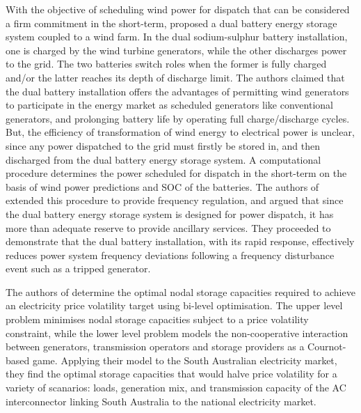 \documentclass[a4paper, 10pt, twocolumn, preprint, 3p]{elsarticle}
\begin{document}
With the objective of scheduling wind power for dispatch that can be considered a firm commitment in the short-term, \cite{YCTL10,YCTL12} proposed a dual battery energy storage system coupled to a wind farm.  In the dual sodium-sulphur battery installation, one is charged by the wind turbine generators, while the other discharges power to the grid.  The two batteries switch roles when the former is fully charged and/or the latter reaches its depth of discharge limit.  The authors claimed that the dual battery installation offers the advantages of permitting wind generators to participate in the energy market as scheduled generators like conventional generators, and prolonging battery life by operating full charge/discharge cycles.  But, the efficiency of transformation of wind energy to electrical power is unclear, since any power dispatched to the grid must firstly be stored in, and then discharged from the dual battery energy storage system.  A computational procedure determines the power scheduled for dispatch in the short-term on the basis of wind power predictions and SOC of the batteries.  The authors of \cite{YCTL14} extended this procedure to provide frequency regulation, and argued that since the dual battery energy storage system is designed for power dispatch, it has more than adequate reserve to provide ancillary services.  They proceeded to demonstrate that the dual battery installation, with its rapid response, effectively reduces power system frequency deviations following a frequency disturbance event such as a tripped generator.

The authors of \cite{MNAC17} determine the optimal nodal storage capacities required to achieve an electricity price volatility target using bi-level optimisation.  The upper level problem minimises nodal storage capacities subject to a price volatility constraint, while the lower level problem models the non-cooperative interaction between generators, transmission operators and storage providers as a Cournot-based game.  Applying their model to the South Australian electricity market, they find the optimal storage capacities that would halve price volatility for a variety of scanarios: loads, generation mix, and transmission capacity of the AC interconnector linking South Australia to the national electricity market.

\end{document}
